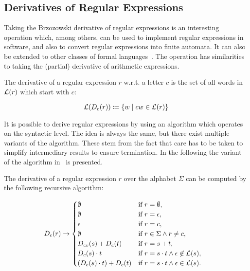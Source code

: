 \subsection{Derivatives of Regular Expressions}

Taking the Brzozowski derivative of regular expressions is an interesting operation which, among others, can be used
to implement regular expressions in software, and also to convert regular expressions into finite automata.
It can also be extended to other classes of formal languages~\cite{parsing-with-derivatives}.
The operation has similarities to taking the (partial) derivative of arithmetic expressions.

\begin{definition}
    The derivative of a regular expression $r$ w.r.t. a letter $c$ is
    the set of all words in $\mathcal{L}(r)$ which start with $c$:

    \begin{align}
        \mathcal{L}(D_c(r)) \coloneqq \{ w \mid c w \in \mathcal{L}(r) \}
    \end{align}
\end{definition}

It is possible to derive regular expressions by using an algorithm which operates on the syntactic level.
The idea is always the same, but there exist multiple variants of the algorithm.
These stem from the fact that care has to be taken to simplify intermediary results to ensure termination.
In the following the variant of the algorithm in~\cite{proof-pearl-regular-expression-equivalence} is presented.

\begin{definition}
    The derivative of a regular expression $r$ over the alphabet $\Sigma$
    can be computed by the following recursive algorithm:

    \begin{align}
        D_{c}(r) &\rightarrow
        \begin{cases}
            \emptyset                       & \text{if } r = \emptyset,\\
            \emptyset                       & \text{if } r = \epsilon,\\
            \epsilon                        & \text{if } r = c,\\
            \emptyset                       & \text{if } r \in \Sigma \land r \neq c,\\
            D_{c v}(s) + D_c(t)                 & \text{if } r = s + t,\\
            D_c(s) \cdot t                  & \text{if } r = s \cdot t \land \epsilon \not\in \mathcal{L}(s),\\
            (D_c(s) \cdot t) + D_c(t)       & \text{if } r = s \cdot t \land \epsilon \in \mathcal{L}(s).
        \end{cases}
    \end{align}
\end{definition}

